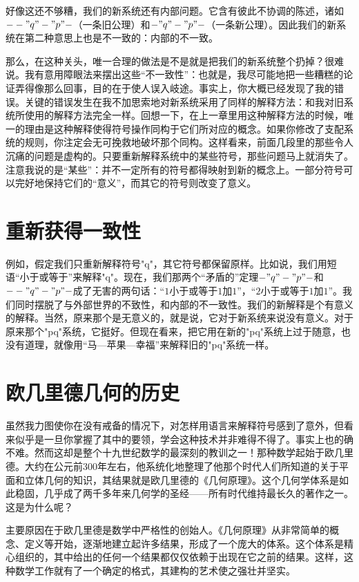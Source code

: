 好像这还不够糟，我们的新系统还有内部问题。它含有彼此不协调的陈述，诸如$--"q"-"p"-$（一条旧公理）和$-"q"-"p"-$（一条新公理）。因此我们的新系统在第二种意思上也是不一致的：内部的不一致。

那么，在这种关头，唯一合理的做法是不是就是把我们的新系统整个扔掉？很难说。我有意用障眼法来摆出这些“不一致性”：也就是，我尽可能地把一些糟糕的论证弄得像那么回事，目的在于使人误入岐途。事实上，你大概已经发现了我的错误。关键的错误发生在我不加思索地对新系统采用了同样的解释方法：和我对旧系统所使用的解释方法完全一样。回想一下，在上一章里用这种解释方法的时候，唯一的理由是这种解释使得符号操作同构于它们所对应的概念。如果你修改了支配系统的规则，你注定会无可挽救地破坏那个同构。这样看来，前面几段里的那些令人沉痛的问题是虚构的。只要重新解释系统中的某些符号，那些问题马上就消失了。注意我说的是“某些”：并不一定所有的符号都得映射到新的概念上。一部分符号可以完好地保持它们的“意义”，而其它的符号则改变了意义。

\section{重新获得一致性}

例如，假定我们只重新解释符号"q"，其它符号都保留原样。比如说，我们用短语“小于或等于”来解释"q"。现在，我们那两个“矛盾的”定理$-"q"-"p"-$和$--"q"-"p"-$成了无害的两句话：“$1$小于或等于$1$加$1$”，“$2$小于或等于$1$加$1$”。我们同时摆脱了与外部世界的不致性，和内部的不一致性。我们的新解释是个有意义的解释。当然，原来那个是无意义的，就是说，它对于新系统来说没有意义。对于原来那个"pq"系统，它挺好。但现在看来，把它用在新的"pq"系统上过于随意，也没有道理，就像用“马—苹果—幸福”来解释旧的"pq"系统一样。

\section{欧几里德几何的历史}

虽然我力图使你在没有戒备的情况下，对怎样用语言来解释符号感到了意外，但看来似乎是一旦你掌握了其中的要领，学会这种技术并非难得不得了。事实上也的确不难。然而这却是整个十九世纪数学的最深刻的教训之一！那种数学起始于欧几里德。大约在公元前300年左右，他系统化地整理了他那个时代人们所知道的关于平面和立体几何的知识，其结果就是欧几里德的《几何原理》。这个几何学体系是如此稳固，几乎成了两千多年来几何学的圣经——所有时代维持最长久的著作之一。这是为什么呢？

主要原因在于欧几里德是数学中严格性的创始人。《几何原理》从非常简单的概念、定义等开始，逐渐地建立起许多结果，形成了一个庞大的体系。这个体系是精心组织的，其中给出的任何一个结果都仅仅依赖于出现在它之前的结果。这样，这种数学工作就有了一个确定的格式，其建构的艺术使之强壮并坚实。

